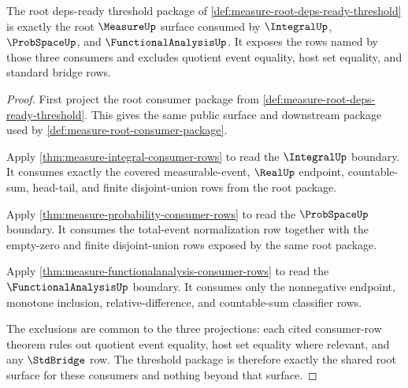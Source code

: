 \begin{theorem}
\label{thm:measure-root-consumer-boundary-threshold}
The root deps-ready threshold package of
\autoref{def:measure-root-deps-ready-threshold} is exactly the root
$\MeasureUp$ surface consumed by $\IntegralUp$, $\ProbSpaceUp$, and
$\FunctionalAnalysisUp$. It exposes the rows named by those three consumers
and excludes quotient event equality, host set equality, and standard bridge
rows.
\end{theorem}
\begin{proof}
First project the root consumer package from
\autoref{def:measure-root-deps-ready-threshold}. This gives the same public
surface and downstream package used by
\autoref{def:measure-root-consumer-package}.

Apply \autoref{thm:measure-integral-consumer-rows} to read the
$\IntegralUp$ boundary. It consumes exactly the covered measurable-event,
$\RealUp$ endpoint, countable-sum, head-tail, and finite disjoint-union rows
from the root package.

Apply \autoref{thm:measure-probability-consumer-rows} to read the
$\ProbSpaceUp$ boundary. It consumes the total-event normalization row
together with the empty-zero and finite disjoint-union rows exposed by the
same root package.

Apply \autoref{thm:measure-functionalanalysis-consumer-rows} to read the
$\FunctionalAnalysisUp$ boundary. It consumes only the nonnegative endpoint,
monotone inclusion, relative-difference, and countable-sum classifier rows.

The exclusions are common to the three projections: each cited consumer-row
theorem rules out quotient event equality, host set equality where relevant,
and any $\StdBridge$ row. The threshold package is therefore exactly the
shared root surface for these consumers and nothing beyond that surface.
\end{proof}

